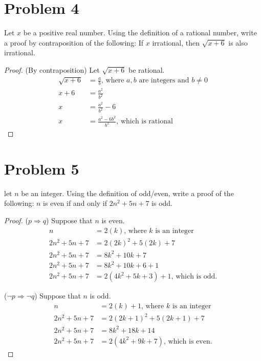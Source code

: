 \documentclass{article}
\newenvironment{problem}[1]{
  \nobreak\section*{Problem #1}
}{}
\begin{document}
  \begin{problem}{4}
    Let $x$ be a positive real number. Using the definition of a rational number, write a proof by contraposition of the following: If $x$ irrational, then $\sqrt{x + 6}$ is also irrational.
    
    \begin{proof}
      (By contraposition) Let $\sqrt{x + 6}$ be rational.
      \begin{equation*}
        \begin{split}
          \sqrt{x + 6} & = \frac{a}{b}\text{, where $a, b$ are integers and $b \neq 0$}\\
          x + 6 & = \frac{a^2}{b^2}\\
          x & = \frac{a^2}{b^2} - 6\\
          x & = \frac{a^2 - 6b^2}{b^2}\text{, which is rational}
        \end{split}
      \end{equation*}
    \end{proof}
  \end{problem}

  \begin{problem}{5}
    let $n$ be an integer. Using the definition of odd/even, write a proof of the following: $n$ is even if and only if $2n^2 + 5n + 7$ is odd.

    \begin{proof}($p \Rightarrow q$) Suppose that $n$ is even.
      \begin{equation*}
        \begin{split}
          n & = 2(k)\text{, where $k$ is an integer}\\
          2n^2 + 5n + 7 & = 2(2k)^2 + 5(2k) + 7\\
          2n^2 + 5n + 7 & = 8k^2 + 10k + 7\\
          2n^2 + 5n + 7 & = 8k^2 + 10k + 6 + 1\\
          2n^2 + 5n + 7 & = 2(4k^2 + 5k + 3) + 1\text{, which is odd.}
        \end{split}
      \end{equation*}
      
      ($\neg p \Rightarrow \neg q$) Suppose that $n$ is odd.
      \begin{equation*}
        \begin{split}
          n & = 2(k) + 1\text{, where $k$ is an integer}\\
          2n^2 + 5n + 7 & = 2(2k + 1)^2 + 5(2k + 1) + 7\\
          2n^2 + 5n + 7 & = 8k^2 + 18k + 14\\
          2n^2 + 5n + 7 & = 2(4k^2 + 9k + 7)\text{, which is even.}
        \end{split}
      \end{equation*}
    \end{proof}
  \end{problem}
\end{document}
